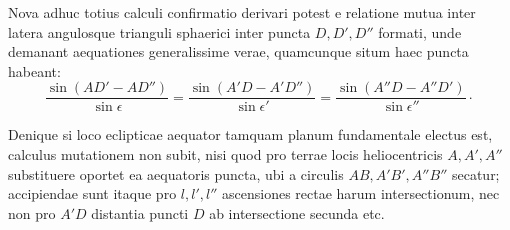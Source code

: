 Nova adhuc totius calculi confirmatio derivari potest e relatione mutua
inter latera angulosque trianguli sphaerici inter puncta $D,D',D''$ formati,
unde demanant aequationes generalissime verae, quamcunque situm haec puncta
habeant:
\[
\frac{\sin(AD'-AD'')}{\sin\epsilon}=\frac{\sin(A'D-A'D'')}{\sin\epsilon'}=\frac{\sin(A''D-A''D')}{\sin\epsilon''}\mathpunct{\cdot}
\]

Denique si loco eclipticae aequator tamquam planum fundamentale electus
\hypertarget{native-185}{}est, calculus mutationem non subit, nisi quod pro terrae locis heliocentricis
$A,A',A''$ substituere oportet ea aequatoris puncta, ubi a circulis $AB,A'B',A''B''$
secatur; accipiendae sunt itaque pro $l,l',l''$ ascensiones rectae harum
intersectionum, nec non pro $A'D$ distantia puncti $D$ ab intersectione secunda etc.
